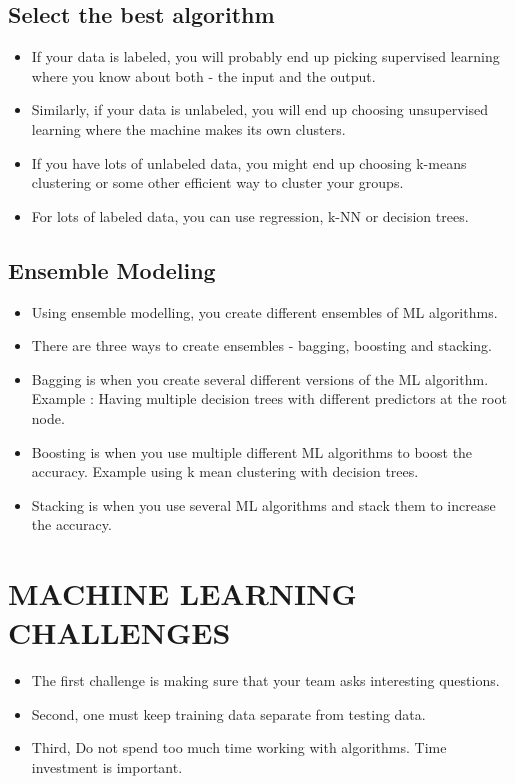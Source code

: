 \documentclass[11pt, oneside]{article}   	%
\begin{document}
\subsection{Select the best algorithm}
\begin{itemize}
\item If your data is labeled, you will probably end up picking supervised learning where you know about both - the input and the output.
\item Similarly, if your data is unlabeled, you will end up choosing unsupervised learning where the machine makes its own clusters.
\item If you have lots of unlabeled data, you might end up choosing k-means clustering or some other efficient way to cluster your groups.
\item For lots of labeled data, you can use regression, k-NN or decision trees.
\end{itemize}
\subsection{Ensemble Modeling}
\begin{itemize}
\item Using ensemble modelling, you create different ensembles of ML algorithms.
\item There are three ways to create ensembles - bagging, boosting and stacking.
\item Bagging is when you create several different versions of the ML algorithm. Example : Having multiple decision trees with different predictors at the root node.
\item Boosting is when you use multiple different ML algorithms to boost the accuracy. Example using k mean clustering with decision trees.
\item Stacking is when you use several ML algorithms and stack them to increase the accuracy.
\end{itemize}
\section{MACHINE LEARNING CHALLENGES}
\begin{itemize}
\item The first challenge is making sure that your team asks interesting questions.
\item Second, one must keep training data separate from testing data.
\item Third, Do not spend too much time working with algorithms. Time investment is important.
\end{itemize}
\end{document}
